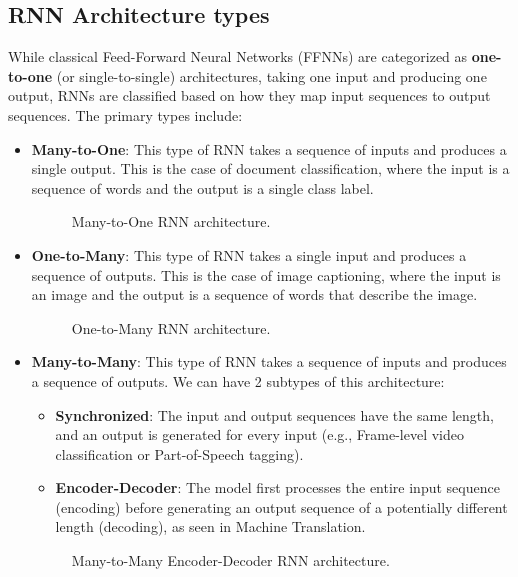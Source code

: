 \subsection{RNN Architecture types}
While classical Feed-Forward Neural Networks (FFNNs) are categorized as \textbf{one-to-one} (or single-to-single) 
architectures, taking one input and producing one output, RNNs are classified based on how they map input sequences to output sequences.
The primary types include:
\begin{itemize}
    \item \textbf{Many-to-One}: This type of RNN takes a sequence of inputs and produces a single output.
    This is the case of document classification, where the input is a sequence of words and the output is a single class label.
    \begin{figure}[H]
        \centering
        
        \caption{Many-to-One RNN architecture.}
    \end{figure}

    \item \textbf{One-to-Many}: This type of RNN takes a single input and produces a sequence of outputs.
    This is the case of image captioning, where the input is an image and the output is a sequence of words that describe the image.
    \begin{figure}[H]
        \centering
        
        \caption{One-to-Many RNN architecture.}
    \end{figure}
    \item \textbf{Many-to-Many}: This type of RNN takes a sequence of inputs and produces a sequence of outputs.
    We can have 2 subtypes of this architecture:
    \begin{itemize}
        \item \textbf{Synchronized}: The input and output sequences have the same length, and an output is generated for every input 
        (e.g., Frame-level video classification or Part-of-Speech tagging).
        \item \textbf{Encoder-Decoder}: The model first processes the entire input sequence (encoding) before generating an output sequence of a potentially different length (decoding), 
        as seen in Machine Translation.
    \end{itemize}
    \begin{figure}[H]
        \centering
        \begin{minipage}{0.45\textwidth}
            \centering
            
            \caption{Many-to-Many Synchronized RNN architecture.}
        \end{minipage}
        \hfill
        \begin{minipage}{0.45\textwidth}
            \centering
            
            \caption{Many-to-Many Encoder-Decoder RNN architecture.}
        \end{minipage}
    \end{figure}
\end{itemize}


